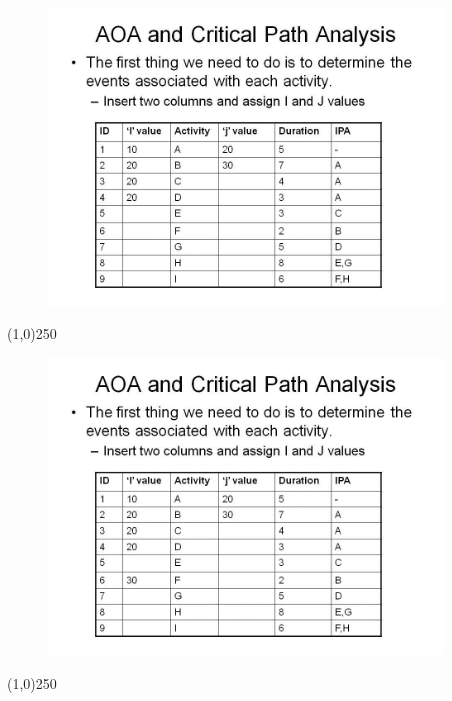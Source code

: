 \begin{frame}
\begin{figure}
	\centering
		\includegraphics[width = 10.5cm]{oldnotes/Slide65.jpg}
\end{figure}
\end{frame}
\begin{center}\line(1,0){250}\end{center}


\begin{frame}
\begin{figure}
	\centering
		\includegraphics[width = 10.5cm]{oldnotes/Slide66.jpg}
\end{figure}
\end{frame}
\begin{center}\line(1,0){250}\end{center}


